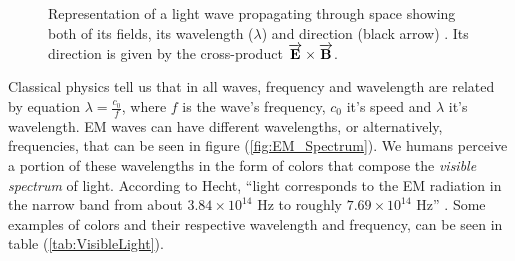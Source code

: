 \begin{figure}[htbp]
    \centering
    \caption{Representation of a light wave propagating through space showing both of its fields, its wavelength ($\lambda$) and direction (black arrow) \protect\cite{Light_EM_Wave_Figure}. Its direction is given by the cross-product $\protect\overrightarrow{\textbf{E}} \times \protect\overrightarrow{\textbf{B}}$.}
    \label{fig:Light_EM_Wave}
\end{figure}


Classical physics tell us that in all waves, frequency and wavelength are related by equation $\lambda = \frac{c_0}{f}$, where $f$ is the wave's frequency, $c_0$ it's speed and $\lambda$ it's wavelength. EM waves can have different wavelengths, or alternatively, frequencies, that can be seen in figure (\ref{fig:EM_Spectrum}). We humans perceive a portion of these wavelengths in the form of colors that compose the \textit{visible spectrum} of light. According to Hecht, ``light corresponds to the EM radiation in the narrow band from about $3.84 \times 10^{14}$ Hz to roughly $7.69 \times 10^{14}$ Hz'' \cite{Hecht_Optics-Visible_Light}. Some examples of colors and their respective wavelength and frequency, can be seen in table (\ref{tab:VisibleLight}).

